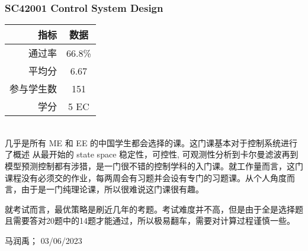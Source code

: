 \subsubsection{SC42001 Control System Design}
\begin{minipage}{0.45\textwidth}
\centering
{}
\end{minipage}%
\begin{minipage}{0.45\textwidth}
\raggedleft
\begin{tabular}{r|c}
\textbf{指标} & \textbf{数据} \\ \hline
通过率 & 66.8\% \\ 
平均分 & 6.67 \\ 
参与学生数 & 151 \\ 
学分 & 5 EC\\
\end{tabular}
\end{minipage}\\

几乎是所有 ME 和 EE 的中国学生都会选择的课。这门课基本对于控制系统进行了概述 从最开始的 state space 稳定性，可控性, 可观测性分析到卡尔曼滤波再到模型预测控制都有涉猎，是一门很不错的控制学科的入门课。就工作量而言，这门课程没有必须交的作业，每两周会有习题并会设有专门的习题课。从个人角度而言，由于是一门纯理论课，所以很难说这门课很有趣。

就考试而言，最优策略是刷近几年的考题。考试难度并不高，但是由于全是选择题且需要答对20题中的14题才能通过，所以极易翻车，需要对计算过程谨慎一些。
\begin{flushright}
马润禹； 03/06/2023
\end{flushright}

